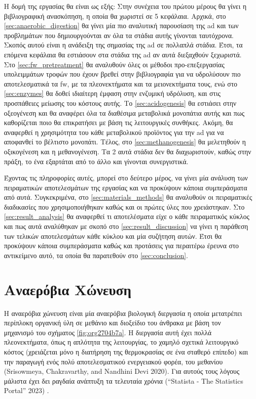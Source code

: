 \documentclass[11pt]{report}
\makeatletter
\newcommand{\citeprocitem}[2]{\hyper@linkstart{cite}{citeproc_bib_item_#1}#2\hyper@linkend}
\makeatother
\begin{document}
Η δομή της εργασίας θα είναι ως εξής: Στην συνέχεια του πρώτου μέρους θα γίνει η βιβλιογραφική ανασκόπηση, η οποία θα χωριστεί σε 5 κεφάλαια. Αρχικά, στο \autoref{sec:anaerobic_digestion} θα γίνει μία πιο αναλυτική παρουσίαση της \acrshort{ad} και των προβλημάτων που δημιουργούνται αν όλα τα στάδια αυτής γίνονται ταυτόχρονα. Σκοπός αυτού είναι η ανάδειξη της σημασίας της \acrshort{ad} σε πολλαπλά στάδια. Έτσι, τα επόμενα κεφάλαια θα εστιάσουν στα στάδια της \acrshort{ad} αν αυτά διεξαχθούν ξεχωριστά. Στο \autoref{sec:fw_pretreatment} θα αναλυθούν όλες οι μέθοδοι προ-επεξεργασίας υπολειμμάτων τροφών που έχουν βρεθεί στην βιβλιογραφία για να υδρολύσουν πιο αποτελεσματικά τα \acrshort{fw}, με τα πλεονεκτήματα και τα μειονεκτήματα τους, ενώ στο \autoref{sec:enzymes} θα δοθεί ιδιαίτερη έμφαση στην ενζυμική υδρόλυση, και στις προσπάθειες μείωσης του κόστους αυτής. Το \autoref{sec:acidogenesis} θα εστιάσει στην οξεογένεση και θα αναφέρει όλα τα διαθέσιμα μεταβολικά μονοπάτια αυτής και πως καθορίζεται ποιο θα επικρατήσει με βάση τις λειτουργικές συνθήκες. Ακόμη, θα αναφερθεί η χρησιμότητα του κάθε μεταβολικού προϊόντος για την \acrshort{ad} για να αποφανθεί το βέλτιστο μονοπάτι. Τέλος, στο \autoref{sec:methanogenesis} θα μελετηθούν η οξικογένεση και η μεθανογένεση. Τα 2 αυτά στάδια δεν θα διαχωριστούν, καθώς στην πράξη, το ένα εξαρτάται από το άλλο και γίνονται συνεργιστικά.

Έχοντας τις πληροφορίες αυτές, μπορεί στο δεύτερο μέρος, να γίνει μία ανάλυση των πειραματικών αποτελεσμάτων της εργασίας και να προκύψουν κάποια συμπεράσματα από αυτά. Συγκεκριμένα, στο \autoref{sec:materials_methods} θα αναλυθούν οι πειραματικές διαδικασίες που χρησιμοποιήθηκαν καθώς και οι πρώτες ύλες που χρειάστηκαν. Στο \autoref{sec:result_analysis} θα αναφερθεί τι αποτελέσματα είχε ο κάθε πειραματικός κύκλος και πως αυτά αναλύθηκαν με σκοπό στο \autoref{sec:result_discussion} να γίνει η παράθεση των τελικών αποτελεσμάτων κάθε κύκλου και μία συζήτηση αυτών. Έτσι θα προκύψουν κάποια συμπεράσματα καθώς και προτάσεις για περαιτέρω έρευνα στο αντικείμενο αυτό, τα οποία θα παρατεθούν στο \autoref{sec:conclusion}.

\chapter{Αναερόβια Χώνευση}
\label{sec:orgd57d5f0}
\label{sec:anaerobic_digestion}

Η αναερόβια χώνευση είναι μία αναερόβια βιολογική διεργασία η οποία μετατρέπει περίπλοκη οργανική ύλη σε μεθάνιο και διοξείδιο του άνθρακα με βάση τον μηχανισμό του σχήματος \ref{fig:org2704b7a}. Η διεργασία αυτή έχει πολλά πλεονεκτήματα, όπως η απλότητα της λειτουργίας, το χαμηλό σχετικά λειτουργικό κόστος (χρειάζεται μόνο η διατήρηση της θερμοκρασίας σε ένα σταθερό επίπεδο) και την παραγωγή ενός πολύ αποτελεσματικού ενεργειακού φορέα, του μεθανίου (\citeprocitem{67}{Srisowmeya, Chakravarthy, and Nandhini Devi 2020}). Για αυτούς τους λόγους μάλιστα έχει δει ραγδαία ανάπτυξη τα τελευταία χρόνια (\citeprocitem{68}{“Statista - The Statistics Portal” 2023}) .
\end{document}
